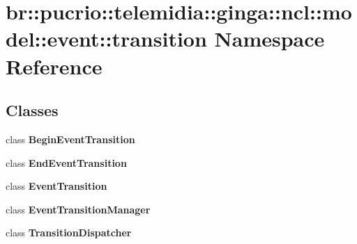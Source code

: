 \section{br::pucrio::telemidia::ginga::ncl::model::event::transition Namespace Reference}
\label{namespacebr_1_1pucrio_1_1telemidia_1_1ginga_1_1ncl_1_1model_1_1event_1_1transition}


\subsection*{Classes}
\begin{CompactItemize}
\item 
class {\bf BeginEventTransition}
\item 
class {\bf EndEventTransition}
\item 
class {\bf EventTransition}
\item 
class {\bf EventTransitionManager}
\item 
class {\bf TransitionDispatcher}
\end{CompactItemize}
